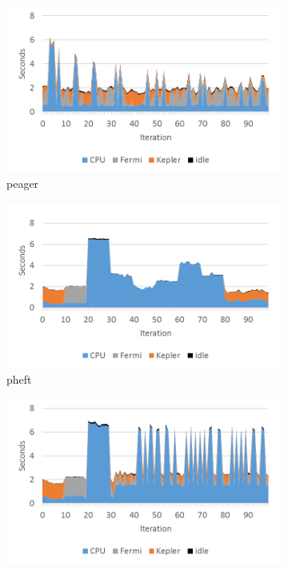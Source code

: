 \documentclass[main.tex]{subfiles}
\begin{document}
\begin{figure}[!htp]
  \centering
  \begin{subfigure}{.5\textwidth}
    \centering
    \includegraphics[width=\linewidth]{profiling/starpu_calibrate_peager}
    \caption{peager \label{fig:prof:starpu_calibrate_peager}}
  \end{subfigure}%
  \begin{subfigure}{.5\textwidth}
    \centering
    \includegraphics[width=\linewidth]{profiling/starpu_calibrate_pheft}
    \caption{pheft \label{fig:prof:starpu_calibrate_pheft}}
  \end{subfigure}
  \begin{subfigure}{.5\textwidth}
    \centering
    \includegraphics[width=\linewidth]{profiling/starpu_calibrate_dm}

\end{subfigure}
\end{figure}
\end{document}
